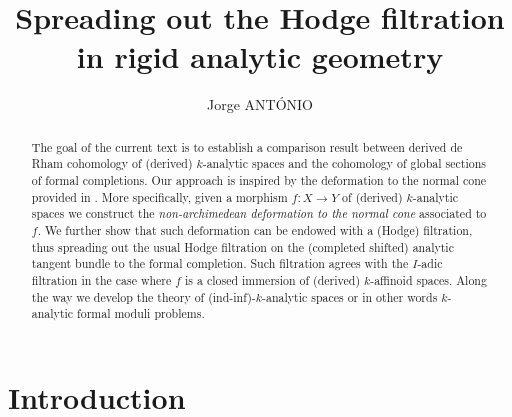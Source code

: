 \documentclass[10pt,a4paper,reqno]{amsart} %
\theoremstyle{plain}
\theoremstyle{definition}
\theoremstyle{remark}
\numberwithin{equation}{section}
\begin{document}
\title{Spreading out the Hodge filtration in rigid analytic geometry}

\author{Jorge ANT\'ONIO}
\address{Jorge ANT\'ONIO, IRMA, UMR 7501
7 rue René-Descartes
67084 Strasbourg Cedex}
\maketitle
\begin{abstract}
    The goal of the current text is to establish a comparison result between derived de Rham cohomology of (derived) $k$-analytic spaces
    and the cohomology of global sections of formal completions. Our approach is inspired by the deformation to the normal cone provided in \cite{Gaitsgory_Study_II}.
    More specifically, given a morphism $f \colon X \to Y$ of (derived) $k$-analytic spaces we construct the \emph{non-archimedean deformation to the normal cone}
    associated to $f$. We further show that such deformation can be endowed with a (Hodge) filtration, thus spreading out the usual Hodge filtration on the (completed shifted) analytic
    tangent bundle to the formal completion. Such filtration agrees with the $I$-adic filtration in the case where $f$ is a closed immersion of (derived) $k$-affinoid spaces.
    Along the way we develop the theory of (ind-inf)-$k$-analytic spaces or in other words $k$-analytic formal moduli problems.
\end{abstract}

\tableofcontents

\section{Introduction}
\end{document}
